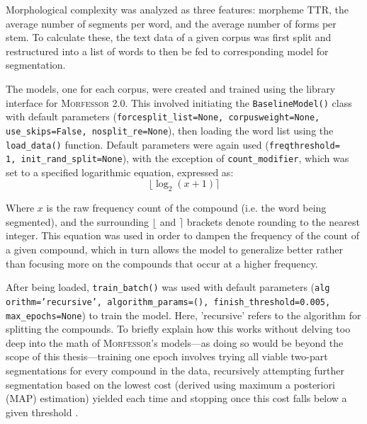 \documentclass[12pt,a4paper]{article}
\numberwithin{figure}{section}
\numberwithin{table}{section}
\numberwithin{definition}{section}
\begin{document}
Morphological complexity was analyzed as three features: morpheme TTR, the average number of segments per word, and the average number of forms per stem. To calculate these, the text data of a given corpus was first split and restructured into a list of words to then be fed to corresponding model for segmentation.

The models, one for each corpus, were created and trained using the library interface for \textsc{Morfessor 2.0}. This involved initiating the \texttt{BaselineModel()} class with default parameters (\texttt{forcesplit\_list=None, corpusweight=None, use\_skips=False, nosplit\_re=None}), then loading the word list using the \texttt{load\_data()} function. Default parameters were again used (\texttt{freqthreshold=\\1, init\_rand\_split=None}), with the exception of \texttt{count\_modifier}, which was set to a specified logarithmic equation, expressed as: \[\lfloor\log_2(x + 1)\rceil\]

Where \( x \) is the raw frequency count of the compound (i.e. the word being segmented), and the surrounding \( \lfloor \) and \( \rceil \) brackets denote rounding to the nearest integer. This equation was used in order to dampen the frequency of the count of a given compound, which in turn allows the model to generalize better rather than focusing more on the compounds that occur at a higher frequency.

After being loaded, \texttt{train\_batch()} was used with default parameters (\texttt{alg\\orithm='recursive', algorithm\_params=(), finish\_threshold=0.005, \\max\_epochs=None}) to train the model. Here, 'recursive' refers to the algorithm for splitting the compounds. To briefly explain how this works without delving too deep into the math of \textsc{Morfessor}'s models---as doing so would be beyond the scope of this thesis---training one epoch involves trying all viable two-part segmentations for every compound in the data, recursively attempting further segmentation based on the lowest cost (derived using maximum a posteriori (MAP) estimation) yielded each time and stopping once this cost falls below a given threshold \parencite{Smit2014inproceedings}. 

\end{document}
